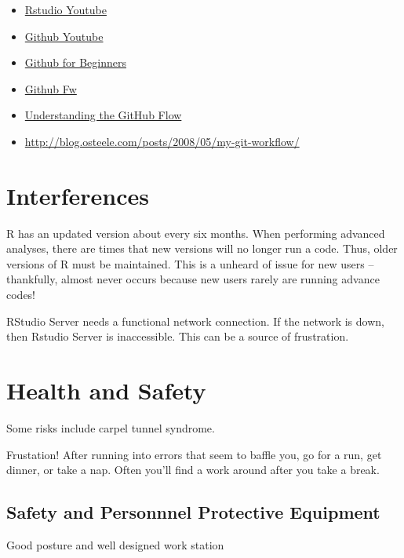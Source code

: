 \documentclass[12pt]{../SOP3_beta}
\begin{document}
\begin{itemize}
  \item \href{https://www.youtube.com/watch?v=uHYcDQDbMY8}{Rstudio Youtube}
  \item \href{https://www.youtube.com/watch?v=0fKg7e37bQE}{Github Youtube}
  \item \href{http://product.hubspot.com/blog/git-and-github-tutorial-for-beginners}{Github for Beginners}
  \item \href{http://scottchacon.com/2011/08/31/github-flow.html}{Github Fw}
  \item \href{https://guides.github.com/introduction/flow/}{Understanding the GitHub Flow}
  \item \href{http://blog.osteele.com/posts/2008/05/my-git-workflow/}{http://blog.osteele.com/posts/2008/05/my-git-workflow/}
  
\end{itemize}


\section{Interferences}

\NP R has an updated version about every six months. When performing advanced analyses, there are times that new versions will no longer run a code. Thus, older versions of R must be maintained. This is a unheard of issue for new users -- thankfully, almost never occurs because new users rarely are running advance codes!

\NP RStudio Server needs a functional network connection. If the network is down, then Rstudio Server is inaccessible. This can be a source of frustration. 

\section{Health and Safety}

\NP Some risks include carpel tunnel syndrome.

\NP Frustation!  After running into errors that seem to baffle you, go for a run, get dinner, or take a nap. Often you'll find a work around after you take a break. 


\subsection*{Safety and Personnnel Protective Equipment}

\NP Good posture and well designed work station
\end{document}
